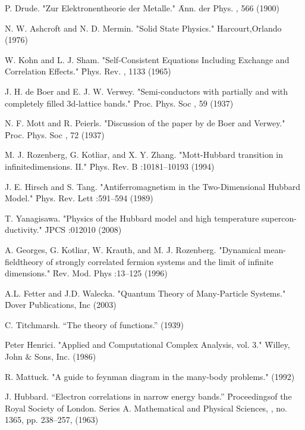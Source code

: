 %
% 

% 
% 
\begin{thebibliography}{4}

{P. Drude. "Zur Elektronentheorie der Metalle."
\f{Ann. der Phys.} , 566 (1900)}

{N. W. Ashcroft and N. D. Mermin. "Solid  State  Physics." Harcourt,Orlando (1976)}

{W. Kohn and L. J. Sham. "Self-Consistent Equations Including Exchange and Correlation Effects." \f{Phys. Rev.} , 1133 (1965)}

{J. H. de Boer and E. J. W. Verwey. "Semi-conductors with partially and with completely filled 3d-lattice bands." \f{Proc. Phys. Soc} , 59 (1937)}

{N. F. Mott and R. Peierls. "Discussion of the paper by de Boer and Verwey." \f{Proc. Phys. Soc} , 72 (1937)}

{M. J. Rozenberg, G. Kotliar, and X. Y. Zhang. "Mott-Hubbard transition in infinitedimensions. II." \f{Phys. Rev. B} :10181–10193 (1994)}

{J. E. Hirsch and S. Tang. "Antiferromagnetism in the Two-Dimensional Hubbard Model." \f{Phys. Rev. Lett} :591–594 (1989)}

{T. Yanagisawa. "Physics of the Hubbard model and high temperature supercon-ductivity." \f{JPCS} :012010 (2008)}

{A. Georges, G. Kotliar, W. Krauth, and M. J. Rozenberg. "Dynamical mean-fieldtheory of strongly correlated fermion systems and the limit of infinite dimensions." \f{Rev. Mod. Phys} :13–125 (1996)}

{A.L. Fetter and J.D. Walecka. "Quantum Theory of Many-Particle Systems." \f{Dover Publications, Inc} (2003)}

{C. Titchmarsh. “The theory of functions.” (1939)}

{Peter Henrici. "Applied and Computational Complex Analysis, vol. 3." \f{Willey, John $\&$ Sons, Inc.} (1986)}

{R. Mattuck. "A guide to feynman diagram in the many-body problems." (1992)}

{J. Hubbard. “Electron correlations in narrow energy bands.” \f{Proceedingsof the Royal Society of London. Series A. Mathematical and Physical Sciences}, , no. 1365, pp. 238–257, (1963)}


\end{thebibliography}
